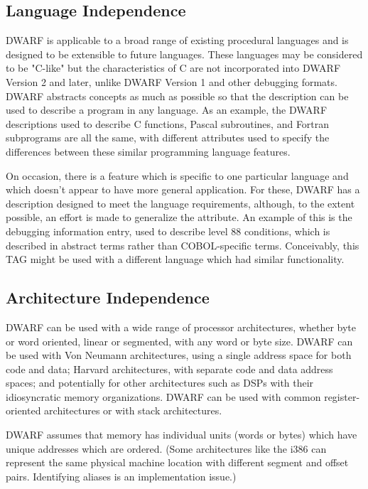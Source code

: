 \subsection{Language Independence}
DWARF is applicable to a broad range of existing procedural 
languages and is designed to be extensible to future languages.  
These languages may be considered to be "C-like" but the 
characteristics of C are not incorporated into DWARF Version 2 
and later, unlike DWARF Version 1 and other debugging formats.  
DWARF abstracts concepts as much as possible so that the 
description can be used to describe a program in any language. 
As an example, the DWARF descriptions used to describe C functions, 
Pascal subroutines, and Fortran subprograms are all the same, 
with different attributes used to specify the differences between 
these similar programming language features. 

On occasion, there is a feature which is specific to one 
particular language and which doesn't appear to have more 
general application.  For these, DWARF has a description 
designed to meet the language requirements, although, to the 
extent possible, an effort is made to generalize the attribute. 
An example of this is the \DWTAGconditionNAME{} 
debugging information entry, 
used to describe  level 88 conditions, which 
is described in abstract terms rather than COBOL-specific terms.  
Conceivably, this TAG might be used with a different language 
which had similar functionality. 

\subsection{Architecture Independence}
DWARF can be used with a wide range of processor architectures, 
whether byte or word oriented, linear or segmented, with any 
word or byte size.  DWARF can be used with Von Neumann architectures, 
using a single address space for both code and data; Harvard 
architectures, with separate code and data address spaces; and 
potentially for other architectures such as DSPs with their 
idiosyncratic memory organizations.  DWARF can be used with 
common register-oriented architectures or with stack architectures. 

DWARF assumes that memory has individual units (words or bytes) 
which have unique addresses which are ordered.  (Some architectures 
like the i386 can represent the same physical machine location with 
different segment and offset pairs.  Identifying aliases is an 
implementation issue.)

